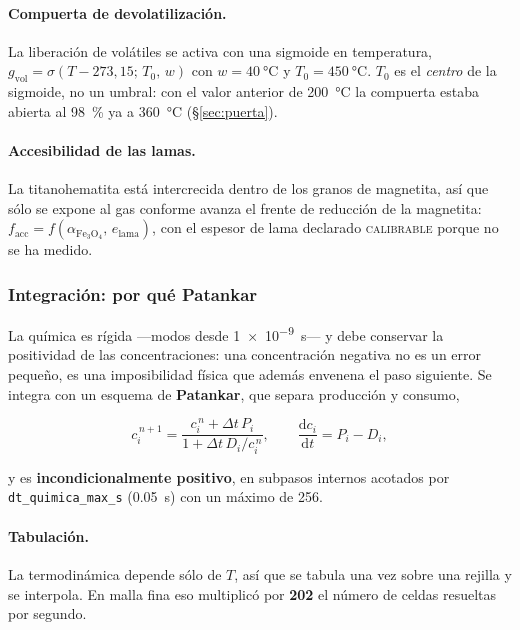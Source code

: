 \paragraph{Compuerta de devolatilización.} La liberación de volátiles se activa
con una sigmoide en temperatura,
$g_{\mathrm{vol}} = \sigma(T - 273{,}15;\, T_0,\, w)$ con $w = \SI{40}{\celsius}$
y $T_0 = \SI{450}{\celsius}$. $T_0$ es el \emph{centro} de la sigmoide, no un
umbral: con el valor anterior de \SI{200}{\celsius} la compuerta estaba abierta
al \qty{98}{\percent} ya a \SI{360}{\celsius} (\S\ref{sec:puerta}).

\paragraph{Accesibilidad de las lamas.} La titanohematita está intercrecida
dentro de los granos de magnetita, así que sólo se expone al gas conforme avanza
el frente de reducción de la magnetita:
$f_{\mathrm{acc}} = f(\alpha_{\mathrm{Fe_3O_4}},\, e_{\mathrm{lama}})$, con el
espesor de lama declarado \textsc{calibrable} porque no se ha medido.

\subsubsection{Integración: por qué Patankar}

La química es rígida ---modos desde \SI{1e-9}{\second}--- y debe conservar la
positividad de las concentraciones: una concentración negativa no es un error
pequeño, es una imposibilidad física que además envenena el paso siguiente. Se
integra con un esquema de \textbf{Patankar}, que separa producción y consumo,

\begin{equation}
c_i^{\,n+1} = \frac{c_i^{\,n} + \Delta t\, P_i}{1 + \Delta t\, D_i / c_i^{\,n}},
\qquad
\frac{\mathrm{d}c_i}{\mathrm{d}t} = P_i - D_i ,
\end{equation}

y es \textbf{incondicionalmente positivo}, en subpasos internos acotados por
\texttt{dt\_quimica\_max\_s} (\SI{0.05}{\second}) con un máximo de 256.

\paragraph{Tabulación.} La termodinámica depende sólo de $T$, así que se tabula
una vez sobre una rejilla y se interpola. En malla fina eso multiplicó por
\textbf{202} el número de celdas resueltas por segundo.


